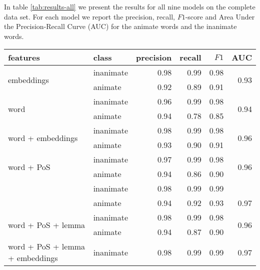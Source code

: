 \documentclass[a4paper,UKenglish]{oasics}
\begin{document}
In table \ref{tab:results-all} we present the results for all nine
models on the complete data set. For each model we report the
precision, recall, $F1$-score and Area Under the Precision-Recall
Curve (AUC) for the animate words and the
inanimate words.

\begin{table}
\centering
\begin{tabular}{llrrrr}
\toprule
features & class & precision &  recall & $F1$ &  AUC \\
\midrule
\multirow{2}{*}{embeddings}                            & inanimate     &       0.98 &    0.99 &    0.98 & \multirow{2}{*}{0.93} \\
                                                       & animate     &       0.92 &    0.89 &    0.91 &  \\
\multirow{2}{*}{word}                                  & inanimate     &       0.96 &    0.99 &    0.98 & \multirow{2}{*}{0.94} \\
                                                       & animate     &       0.94 &    0.78 &    0.85 &  \\
\multirow{2}{*}{word + embeddings}                     & inanimate     &       0.98 &    0.99 &    0.98 & \multirow{2}{*}{0.96} \\
                                                       & animate     &       0.93 &    0.90 &    0.91 &  \\
\multirow{2}{*}{word + PoS}                            & inanimate     &       0.97 &    0.99 &    0.98 & \multirow{2}{*}{0.96} \\
                                                       & animate     &       0.94 &    0.86 &    0.90 &  \\
\rowcolor{Gray}                                        & inanimate     &       0.98 &    0.99 &    0.99 &  \\
\rowcolor{Gray}\multirow{-2}{*}{word + PoS + embeddings}   & animate     &       0.94 &    0.92 &    0.93 & \multirow{-2}{*}{0.97} \\
\multirow{2}{*}{word + PoS + lemma}                    & inanimate    &       0.98 &    0.99 &    0.98 & \multirow{2}{*}{0.96} \\
                                                       & animate     &       0.94 &    0.87 &    0.90 &  \\
\multirow{2}{*}{word + PoS + lemma + embeddings}       & inanimate     &       0.98 &    0.99 &    0.99 & \multirow{2}{*}{0.97} \\

\end{tabular}
\end{table}
\end{document}

